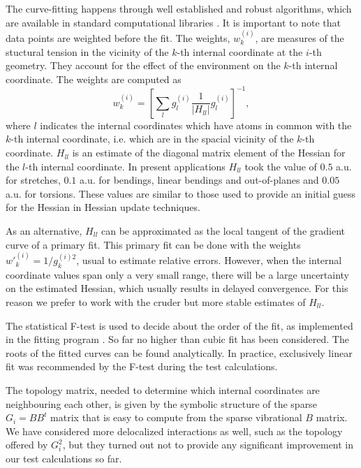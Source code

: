 \documentclass[prl,twocolumn,showpacs,twocolumngrid,superbib]{revtex4}
\begin{document}
The curve-fitting happens through 
well established and robust algorithms, which are available in standard 
computational libraries \cite{slatec}. 
It is important to note
that data points are weighted before the fit. The weights, 
$w_{k}^{(i)}$, are
measures of the stuctural tension in the vicinity of the $k$-th internal
coordinate at the $i$-th geometry. They account for the effect of the 
environment on the $k$-th internal coordinate. 
The weights are computed as
\begin{equation}
w_{k}^{(i)} = \left[ \sum_{l} g_{l}^{(i)} \frac{1}{|H_{ll}^{}|} g_{l}^{(i)} \right]^{-1} ,
\end{equation}
where $l$ indicates the internal coordinates which have atoms in common
with the $k$-th internal coordinate, i.e. which are in the spacial 
vicinity of the $k$-th coordinate. 
$H_{ll}^{}$ is an estimate
of the diagonal matrix element of the Hessian for the $l$-th 
internal coordinate. In present applications $H_{ll}$ took
the value of $0.5$ a.u. for stretches, $0.1$ a.u. 
for bendings, linear bendings 
and out-of-planes and $0.05$ a.u. for torsions. These values are
similar to those used to provide an initial guess for the Hessian in
Hessian update techniques.

As an alternative, $H_{ll}$ can be approximated
as the local tangent of the gradient curve of a primary fit. 
This primary fit can be done with 
the weights $w{'}_{k}^{(i)} = 1/g_{k}^{(i)2}$, usual to 
estimate relative errors. However, when the internal coordinate values
span only a very small range, there will be a large uncertainty on the
estimated Hessian, which usually results in delayed convergence. 
For this reason we prefer to work with the cruder but more stable
estimates of $H_{ll}$. 

The statistical F-test is used to decide about the order of the fit,
as implemented in the fitting program \cite{slatec}.
So far no higher than cubic fit has been considered. The roots
of the fitted curves can be found analytically. In practice,
exclusively linear fit was recommended by the F-test during
the test calculations.

The topology matrix, needed to determine which internal coordinates
are neighbouring each other, is given by the symbolic structure of 
the sparse $G_{i}=BB^{t}$ matrix that is easy to compute from the
sparse vibrational $B$ matrix. We have considered more delocalized 
interactions as well, such as the topology offered by $G_i^2$,
but they turned out not to provide any significant improvement in our
test calculations so far.
\end{document}
